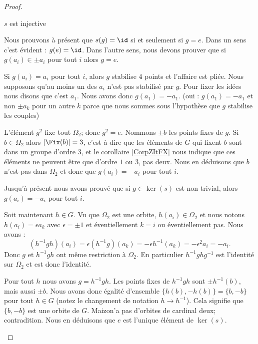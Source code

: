 \begin{proof}
\begin{subproof}
\begin{subproof}
                \item[\( s\) est injective]

                    Nous prouvons à présent que \( s(g)=\id\) si et seulement si \( g=e\). Dans un sens c'est évident : \( g(e)=\id\). Dans l'autre sens, nous devons prouver que si \( g(a_i)\in \pm a_i\) pour tout \( i\) alors \( g=e\).

                    Si \( g(a_i)=a_i\) pour tout \( i\), alors \( g\) stabilise \( 4\) points et l'affaire est pliée. Nous supposons qu'au moins un des \( a_i\) n'est pas stabilisé par \( g\). Pour fixer les idées nous disons que c'est \( a_1\). Nous avons donc \( g(a_1)=-a_1\). (oui : \( g(a_1)=-a_1\) et non \( \pm a_k\) pour un autre \( k\) parce que nous sommes sous l'hypothèse que \( g\) stabilise les couples)

                    L'élément \( g^2\) fixe tout \( \Omega_2\); donc \( g^2=e\). Nommons \( \pm b\) les points fixes de \( g\). Si \( b\in \Omega_2\) alors \( | \Fix(b) |=3\), c'est à dire que les éléments de \( G\) qui fixent \( b\) sont dans un groupe d'ordre \( 3\), et le corollaire \ref{CorpZItFX} nous indique que ces éléments ne peuvent être que d'ordre \( 1\) ou \( 3\), pas deux. Nous en déduisons que \( b\) n'est pas dans \( \Omega_2\) et donc que \( g(a_i)=-a_i\) pour tout \( i\).

                    Jusqu'à présent nous avons prouvé que si \( g\in \ker(s)\) est non trivial,  alors \( g(a_i)=-a_i\) pour tout \( i\).

                    Soit maintenant \( h\in G\). Vu que \( \Omega_2\) est une orbite, \( h(a_i)\in \Omega_2\) et nous notons \( h(a_i)=\epsilon a_k\) avec \( \epsilon=\pm 1\) et éventiellement \( k=i\) ou éventiellement pas. Nous avons :
                    \begin{equation}
                        (h^{-1}gh)(a_i)=\epsilon (h^{-1} g)(a_k)=-\epsilon h^{-1}(a_k)=-\epsilon^2 a_i=-a_i.
                    \end{equation}
                    Donc \( g\) et \( h^{-1} g h\) ont même restriction à \( \Omega_2\). En particulier \( h^{-1} ghg^{-1}\) est l'identité sur \( \Omega_2\) et est donc l'identité.

                    Pour tout \( h\) nous avons \( g=h^{-1} gh\). Les points fixes de \( h^{-1}g h\) sont \( \pm h^{-1}(b)\), mais aussi \( \pm b\). Nous avons donc égalité d'ensemble \( \{ h(b),-h(b) \}=\{ b,-b \}\) pour tout \( h\in G\) (notez le changement de notation \( h\to h^{-1}\)). Cela signifie que \( \{ b,-b \}\) est une orbite de \( G\). Maizon'a pas d'orbites de cardinal deux; contradition. Nous en déduisons que \( e\) est l'unique élément de \( \ker(s)\).


\end{subproof}
\end{subproof}
\end{proof}
